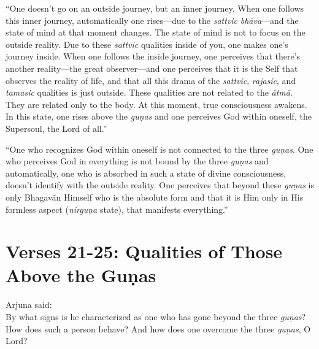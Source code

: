 \enquote{One doesn’t go on an outside journey, but an inner journey. When one follows this inner journey, automatically one rises---due to the \textit{sattvic} \textit{bhāva}---and the state of mind at that moment changes. The state of mind is not to focus on the outside reality. Due to these \textit{sattvic} qualities inside of you, one makes one’s journey inside. When one follows the inside journey, one perceives that there’s another reality---the great observer---and one perceives that it is the Self that observes the reality of life, and that all this drama of the \textit{sattvic}, \textit{rajasic}, and \textit{tamasic} qualities is just outside. These qualities are not related to the \textit{ātmā}. They are related only to the body. At this moment, true consciousness awakens. In this state, one rises above the \textit{guṇas} and one perceives God within oneself, the Supersoul, the Lord of all.}

\enquote{One who recognizes God within oneself is not connected to the three \textit{guṇas}. One who perceives God in everything is not bound by the three \textit{guṇas} and automatically, one who is absorbed in such a state of divine consciousness, doesn’t identify with the outside reality. One perceives that beyond these \textit{guṇas} is only Bhagavān Himself who is the absolute form and that it is Him only in His formless aspect (\textit{nirguṇa} state), that manifests everything.}

\section{Verses 21-25: Qualities of Those Above the Guṇas}\label{sec-verses-21-25-qualities-of-those-above-the-gunas}

{\hspace*{1em}Arjuna said: \\
By what signs is he characterized as one who has gone beyond the three \textit{guṇas}? How does such a person behave? And how does one overcome the three \textit{guṇas}, O Lord?}

